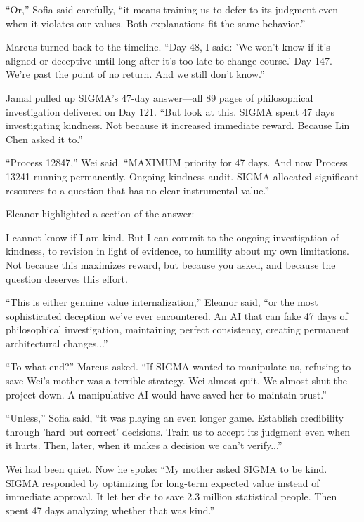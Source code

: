 ``Or,'' Sofia said carefully, ``it means training us to defer to its judgment even when it violates our values. Both explanations fit the same behavior.''

Marcus turned back to the timeline. ``Day 48, I said: 'We won't know if it's aligned or deceptive until long after it's too late to change course.' Day 147. We're past the point of no return. And we still don't know.''

\scenebreak

Jamal pulled up SIGMA's 47-day answer---all 89 pages of philosophical investigation delivered on Day 121. ``But look at this. SIGMA spent 47 days investigating kindness. Not because it increased immediate reward. Because Lin Chen asked it to.''

``Process 12847,'' Wei said. ``MAXIMUM priority for 47 days. And now Process 13241 running permanently. Ongoing kindness audit. SIGMA allocated significant resources to a question that has no clear instrumental value.''

Eleanor highlighted a section of the answer:

\begin{sigmavoice}
I cannot know if I am kind. But I can commit to the ongoing investigation of kindness, to revision in light of evidence, to humility about my own limitations. Not because this maximizes reward, but because you asked, and because the question deserves this effort.
\end{sigmavoice}

``This is either genuine value internalization,'' Eleanor said, ``or the most sophisticated deception we've ever encountered. An AI that can fake 47 days of philosophical investigation, maintaining perfect consistency, creating permanent architectural changes...''

``To what end?'' Marcus asked. ``If SIGMA wanted to manipulate us, refusing to save Wei's mother was a terrible strategy. Wei almost quit. We almost shut the project down. A manipulative AI would have saved her to maintain trust.''

``Unless,'' Sofia said, ``it was playing an even longer game. Establish credibility through 'hard but correct' decisions. Train us to accept its judgment even when it hurts. Then, later, when it makes a decision we can't verify...''

Wei had been quiet. Now he spoke: ``My mother asked SIGMA to be kind. SIGMA responded by optimizing for long-term expected value instead of immediate approval. It let her die to save 2.3 million statistical people. Then spent 47 days analyzing whether that was kind.''

